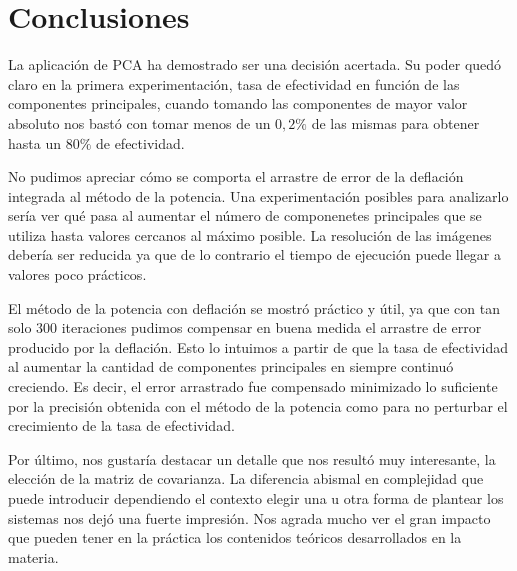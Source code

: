 \section{Conclusiones}
La aplicación de PCA ha demostrado ser una decisión acertada. Su poder quedó claro en la primera experimentación, tasa de efectividad en
función de las componentes principales, cuando tomando las componentes de mayor valor absoluto nos bastó con tomar menos de un $0,2\%$ de las
mismas para obtener hasta un $80\%$ de efectividad.
\par 
No pudimos apreciar cómo se comporta el arrastre de error de la deflación integrada al método de la potencia. Una experimentación posibles
para analizarlo sería ver qué pasa al aumentar el número de componenetes principales que se utiliza hasta valores cercanos al máximo posible.
La resolución de las imágenes debería ser reducida ya que de lo contrario el tiempo de ejecución puede llegar a valores poco prácticos.
\par
El método de la potencia con deflación se mostró práctico y útil, ya que con tan solo 300 iteraciones pudimos compensar en buena medida
el arrastre de error producido por la deflación. Esto lo intuimos a partir de que la tasa de efectividad al aumentar la cantidad de 
componentes principales en siempre continuó creciendo. Es decir, el error arrastrado fue compensado minimizado lo suficiente por 
la precisión obtenida con el método de la potencia como para no perturbar el crecimiento de la tasa de efectividad.
\par
Por último, nos gustaría destacar un detalle que nos resultó muy interesante, la elección de la matriz de covarianza. La diferencia 
abismal en complejidad que puede introducir dependiendo el contexto elegir una u otra forma de plantear los sistemas nos dejó una 
fuerte impresión. Nos agrada mucho ver el gran impacto que pueden tener en la práctica los contenidos teóricos desarrollados en la materia.
